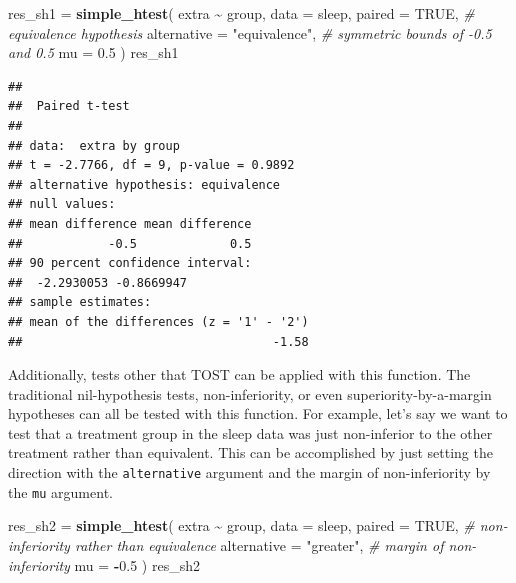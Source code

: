 \documentclass[]{interact}
\theoremstyle{plain}%
\theoremstyle{definition}
\theoremstyle{remark}
\newenvironment{Shaded}{\begin{snugshade}}{\end{snugshade}}
\newcommand{\AttributeTok}[1]{\textcolor[rgb]{0.13,0.29,0.53}{#1}}
\newcommand{\CommentTok}[1]{\textcolor[rgb]{0.56,0.35,0.01}{\textit{#1}}}
\newcommand{\ConstantTok}[1]{\textcolor[rgb]{0.56,0.35,0.01}{#1}}
\newcommand{\FloatTok}[1]{\textcolor[rgb]{0.00,0.00,0.81}{#1}}
\newcommand{\FunctionTok}[1]{\textcolor[rgb]{0.13,0.29,0.53}{\textbf{#1}}}
\newcommand{\NormalTok}[1]{#1}
\newcommand{\OtherTok}[1]{\textcolor[rgb]{0.56,0.35,0.01}{#1}}
\newcommand{\SpecialCharTok}[1]{\textcolor[rgb]{0.81,0.36,0.00}{\textbf{#1}}}
\newcommand{\StringTok}[1]{\textcolor[rgb]{0.31,0.60,0.02}{#1}}
\begin{document}
\begin{Shaded}
\begin{Highlighting}[]
\NormalTok{res\_sh1 }\OtherTok{=} \FunctionTok{simple\_htest}\NormalTok{(}
\NormalTok{  extra }\SpecialCharTok{\textasciitilde{}}\NormalTok{ group,}
  \AttributeTok{data =}\NormalTok{ sleep,}
  \AttributeTok{paired =} \ConstantTok{TRUE}\NormalTok{,}
  \CommentTok{\# equivalence hypothesis}
  \AttributeTok{alternative =} \StringTok{"equivalence"}\NormalTok{,}
  \CommentTok{\# symmetric bounds of {-}0.5 and 0.5}
  \AttributeTok{mu =} \FloatTok{0.5}
\NormalTok{)}
\NormalTok{res\_sh1}
\end{Highlighting}
\end{Shaded}

\begin{verbatim}
## 
##  Paired t-test
## 
## data:  extra by group
## t = -2.7766, df = 9, p-value = 0.9892
## alternative hypothesis: equivalence
## null values:
## mean difference mean difference 
##            -0.5             0.5 
## 90 percent confidence interval:
##  -2.2930053 -0.8669947
## sample estimates:
## mean of the differences (z = '1' - '2') 
##                                   -1.58
\end{verbatim}

Additionally, tests other that TOST can be applied with this function.
The traditional nil-hypothesis tests, non-inferiority, or even
superiority-by-a-margin hypotheses can all be tested with this function.
For example, let's say we want to test that a treatment group in the
sleep data was just non-inferior to the other treatment rather than
equivalent. This can be accomplished by just setting the direction with
the \texttt{alternative} argument and the margin of non-inferiority by
the \texttt{mu} argument.

\begin{Shaded}
\begin{Highlighting}[]
\NormalTok{res\_sh2 }\OtherTok{=} \FunctionTok{simple\_htest}\NormalTok{(}
\NormalTok{  extra }\SpecialCharTok{\textasciitilde{}}\NormalTok{ group,}
  \AttributeTok{data =}\NormalTok{ sleep,}
  \AttributeTok{paired =} \ConstantTok{TRUE}\NormalTok{,}
  \CommentTok{\# non{-}inferiority rather than equivalence}
  \AttributeTok{alternative =} \StringTok{"greater"}\NormalTok{,}
  \CommentTok{\# margin of non{-}inferiority}
  \AttributeTok{mu =} \SpecialCharTok{{-}}\FloatTok{0.5}
\NormalTok{)}
\NormalTok{res\_sh2}
\end{Highlighting}
\end{Shaded}
\end{document}
